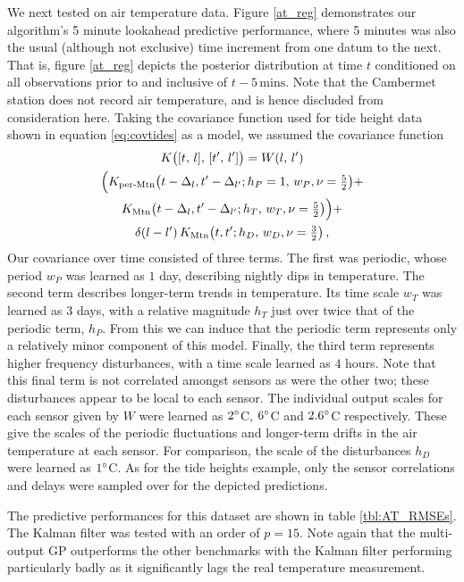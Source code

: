 \documentclass{acmtrans2m}
\newcommand{\dnt}[1]{_{{#1}}}
\newcommand{\Kl}[1]{K_{\text{#1}}}
\begin{document}
We next tested on air temperature data. Figure \ref{at_reg} demonstrates our algorithm's 5 minute lookahead predictive performance, where 5 minutes was also the usual (although not exclusive) time increment from one datum to the next. That is, figure \ref{at_reg} depicts the posterior distribution at time $t$ conditioned on all observations prior to and inclusive of $t-5\,\text{mins}$. Note that the Cambermet station does not record air temperature, and is hence discluded from consideration here. Taking the covariance function used for tide height data shown in equation \eqref{eq:covtides} as a model, we assumed the covariance function
\begin{multline*} %
 K\bigl([t,\,l],\,[t',\,l']\bigr)={W}(l,\,l')\\
\Bigl(
\Kl{per-Mtn}\bigl(t-\Delta_{l},t'-\Delta_{l'};h\dnt{P}=1,\,w_P,\nu=\tfrac{5}{2}\bigr)+
\\
\Kl{Mtn}\bigl(t-\Delta_{l},t'-\Delta_{l'};h\dnt{T},\,w\dnt{T},\nu=\tfrac{5}{2}\bigr)
\Bigr)+
\\
\dd{l}{l'}\Kl{Mtn}\bigl(t,t';h\dnt{D},\,w\dnt{D},\nu=\tfrac{3}{2}\bigr)
\,,
\end{multline*}
Our covariance over time consisted of three terms. The first was periodic, whose period $w_P$ was learned as $1$ day, describing nightly dips in temperature. The second term describes longer-term trends in temperature. Its time scale $w\dnt{T}$ was learned as $3$ days, with a relative magnitude $h\dnt{T}$ just over twice that of the periodic term, $h\dnt{P}$. From this we can induce that the periodic term represents only a relatively minor component of this model. Finally, the third term represents higher frequency disturbances, with a time scale learned as $4$ hours. Note that this final term is not correlated amongst sensors as were the other two; these disturbances appear to be local to each sensor. The individual output scales for each sensor given by $W$ were learned as $2^\circ$C, $6^\circ$C and $2.6^\circ$C respectively. These give the scales of the periodic fluctuations and longer-term drifts in the air temperature at each sensor. For comparison, the scale of the disturbances $h\dnt{D}$ were learned as $1^\circ$C. As for the tide heights example, only the sensor correlations and delays were sampled over for the depicted predictions.

The predictive performances for this dataset are shown in table \ref{tbl:AT_RMSEs}. The Kalman filter was tested with an order of $p=15$. Note again that the multi-output GP outperforms the other benchmarks with the Kalman filter performing particularly badly as it significantly lags the real temperature measurement.
\end{document}
